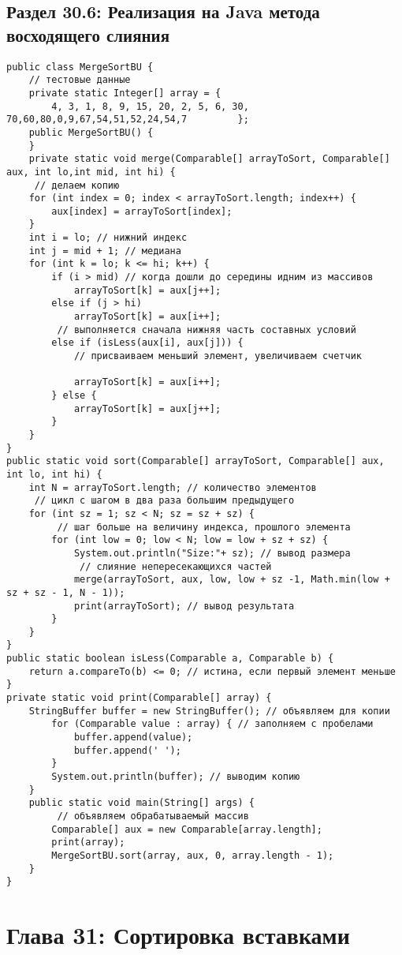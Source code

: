 \section*{Раздел 30.6: Реализация на Java метода восходящего слияния} 
\begin{tcolorbox}
\begin{verbatim}
public class MergeSortBU {
	// тестовые данные
	private static Integer[] array = { 
		4, 3, 1, 8, 9, 15, 20, 2, 5, 6, 30, 70,60,80,0,9,67,54,51,52,24,54,7		 };
	public MergeSortBU() {
	}
	private static void merge(Comparable[] arrayToSort, Comparable[] aux, int lo,int mid, int hi) {
	 // делаем копию
	for (int index = 0; index < arrayToSort.length; index++) {
		aux[index] = arrayToSort[index];
	}
	int i = lo; // нижний индекс
	int j = mid + 1; // медиана
	for (int k = lo; k <= hi; k++) {
		if (i > mid) // когда дошли до середины идним из массивов
			arrayToSort[k] = aux[j++];
		else if (j > hi)
			arrayToSort[k] = aux[i++];
		 // выполняется сначала нижняя часть составных условий
		else if (isLess(aux[i], aux[j])) {
			// присваиваем меньший элемент, увеличиваем счетчик

			arrayToSort[k] = aux[i++];
		} else {
			arrayToSort[k] = aux[j++];
		}
	}
}
public static void sort(Comparable[] arrayToSort, Comparable[] aux, int lo, int hi) {
	int N = arrayToSort.length; // количество элементов
	 // цикл с шагом в два раза большим предыдущего
	for (int sz = 1; sz < N; sz = sz + sz) {
		 // шаг больше на величину индекса, прошлого элемента
		for (int low = 0; low < N; low = low + sz + sz) {
			System.out.println("Size:"+ sz); // вывод размера
			 // слияние непересекающихся частей
			merge(arrayToSort, aux, low, low + sz -1, Math.min(low + sz + sz - 1, N - 1));
			print(arrayToSort); // вывод результата
		}
	}
}
public static boolean isLess(Comparable a, Comparable b) {
	return a.compareTo(b) <= 0; // истина, если первый элемент меньше
}
private static void print(Comparable[] array) {
	StringBuffer buffer = new StringBuffer(); // объявляем для копии
		for (Comparable value : array) { // заполняем с пробелами
			buffer.append(value);
			buffer.append(' ');
		}
		System.out.println(buffer); // выводим копию
	}
	public static void main(String[] args) {
		 // объявляем обрабатываемый массив
		Comparable[] aux = new Comparable[array.length];
		print(array);
		MergeSortBU.sort(array, aux, 0, array.length - 1);
	}
}
\end{verbatim}
\end{tcolorbox}
\newpage
\chapter*{Глава 31: Сортировка вставками } 

